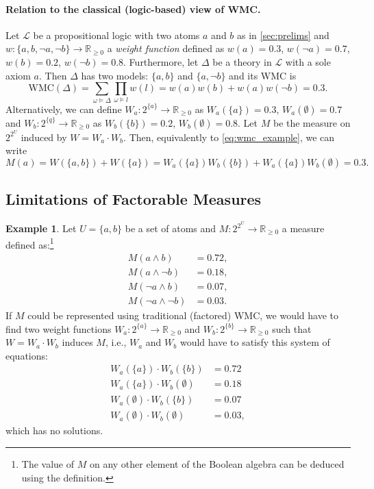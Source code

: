 \documentclass{article}
\theoremstyle{definition}
\newtheorem{example}{Example}
\theoremstyle{remark}
\begin{document}
{\paragraph{Relation to the classical (logic-based) view of WMC.} Let
$\mathcal{L}$ be a propositional logic with two atoms $a$ and $b$ as in
\cref{sec:prelims} and $w\colon \{ a, b, \neg a, \neg b \} \to \mathbb{R}_{\ge
  0}$ a \emph{weight function} defined as $w(a) = 0.3$, $w(\neg a) = 0.7$, $w(b)
= 0.2$, $w(\neg b) = 0.8$. Furthermore, let $\Delta$ be a theory in
$\mathcal{L}$ with a sole axiom $a$. Then $\Delta$ has two models: $\{ a, b \}$
and $\{ a, \neg b \}$ and its WMC \cite{DBLP:journals/ai/ChaviraD08} is
\begin{equation} \label{eq:wmc_example}
  \mathrm{WMC}(\Delta) = \sum_{\omega \models \Delta} \prod_{\omega \models l} w(l) = w(a)w(b) + w(a)w(\neg b) = 0.3.
\end{equation}
Alternatively, we can define $W_a\colon 2^{\{a\}} \to \mathbb{R}_{\ge 0}$ as
$W_a(\{ a \}) = 0.3$, $W_a(\emptyset) = 0.7$ and $W_b\colon 2^{\{q\}} \to
\mathbb{R}_{\ge 0}$ as $W_b(\{ b \}) = 0.2$, $W_b(\emptyset) = 0.8$. Let $M$ be
the measure on $2^{2^U}$ induced by $W = W_a \cdot W_b$. Then, equivalently to
\cref{eq:wmc_example}, we can write
\[
  M(a) = W(\{ a, b \}) + W(\{ a \}) = W_a(\{a\})W_b(\{b\}) +
  W_a(\{a\})W_b(\emptyset) = 0.3.
\]

\subsection{Limitations of Factorable Measures}

\begin{example}
  Let $U = \{a, b\}$ be a set of atoms and $M\colon 2^{2^U} \to \mathbb{R}_{\ge
    0}$ a measure defined as:\footnote{The value of $M$ on any other element of
    the Boolean algebra can be deduced using the definition.}
  \begin{align*}
    M(a \land b) &= 0.72, \\
    M(a \land \neg b) &= 0.18, \\
    M(\neg a \land b) &= 0.07, \\
    M(\neg a \land \neg b) &= 0.03.
  \end{align*}
  If $M$ could be represented using traditional (factored) WMC, we would have to
  find two weight functions $W_a\colon 2^{\{a\}} \to \mathbb{R}_{\ge 0}$ and
  $W_b\colon 2^{\{b\}} \to \mathbb{R}_{\ge 0}$ such that $W = W_a \cdot W_b$
  induces $M$, i.e., $W_a$ and $W_b$ would have to satisfy this system of
  equations:
  \begin{align*}
    W_a(\{a\}) \cdot W_b(\{b\}) &= 0.72 \\
    W_a(\{a\}) \cdot W_b(\emptyset) &= 0.18 \\
    W_a(\emptyset) \cdot W_b(\{b\}) &= 0.07 \\
    W_a(\emptyset) \cdot W_b(\emptyset) &= 0.03,
  \end{align*}
  which has no solutions.


\end{example}}
\end{document}
